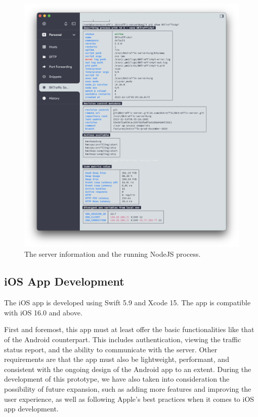 \begin{figure}[H]
    \centering
    \includegraphics[width=\textwidth]{assets/images/Implementation/pm2_show.png}
    \caption{The server information and the running NodeJS process.}
    \label{fig:pm2_show}
\end{figure}

\subsection{iOS App Development}
The iOS app is developed using Swift 5.9 and Xcode 15. The app is compatible with iOS 16.0 and above.

First and foremost, this app must at least offer the basic functionalities like that of the Android counterpart. This includes authentication, viewing the traffic status report, and the ability to communicate with the server. Other requirements are that the app must also be lightweight, performant, and consistent with the ongoing design of the Android app to an extent. During the development of this prototype, we have also taken into consideration the possibility of future expansion, such as adding more features and improving the user experience, as well as following Apple's best practices when it comes to iOS app development.

